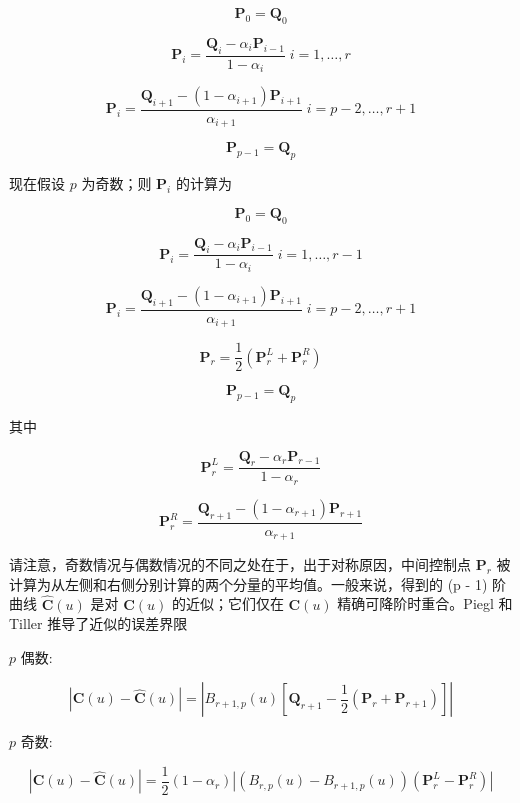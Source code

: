 \documentclass[../main.tex]{subfiles}
\begin{document}
\[
{\mathbf{P}}_{0} = {\mathbf{Q}}_{0}
\]

\[
{\mathbf{P}}_{i} = \frac{{\mathbf{Q}}_{i} - {\alpha }_{i}{\mathbf{P}}_{i - 1}}{1 - {\alpha }_{i}}\;i = 1,\ldots ,r
\]

\[
{\mathbf{P}}_{i} = \frac{{\mathbf{Q}}_{i + 1} - \left( {1 - {\alpha }_{i + 1}}\right) {\mathbf{P}}_{i + 1}}{{\alpha }_{i + 1}}\;i = p - 2,\ldots ,r + 1
\]

\[
{\mathbf{P}}_{p - 1} = {\mathbf{Q}}_{p} \tag{5.41}
\]

现在假设 \(p\) 为奇数；则 \({\mathbf{P}}_{i}\) 的计算为

\[
{\mathbf{P}}_{0} = {\mathbf{Q}}_{0}
\]

\[
{\mathbf{P}}_{i} = \frac{{\mathbf{Q}}_{i} - {\alpha }_{i}{\mathbf{P}}_{i - 1}}{1 - {\alpha }_{i}}\;i = 1,\ldots ,r - 1
\]

\[
{\mathbf{P}}_{i} = \frac{{\mathbf{Q}}_{i + 1} - \left( {1 - {\alpha }_{i + 1}}\right) {\mathbf{P}}_{i + 1}}{{\alpha }_{i + 1}}\;i = p - 2,\ldots ,r + 1
\]

\[
{\mathbf{P}}_{r} = \frac{1}{2}\left( {{\mathbf{P}}_{r}^{L} + {\mathbf{P}}_{r}^{R}}\right)
\]

\[
{\mathbf{P}}_{p - 1} = {\mathbf{Q}}_{p} \tag{5.42}
\]

其中

\[
{\mathbf{P}}_{r}^{L} = \frac{{\mathbf{Q}}_{r} - {\alpha }_{r}{\mathbf{P}}_{r - 1}}{1 - {\alpha }_{r}}
\]

\[
{\mathbf{P}}_{r}^{R} = \frac{{\mathbf{Q}}_{r + 1} - \left( {1 - {\alpha }_{r + 1}}\right) {\mathbf{P}}_{r + 1}}{{\alpha }_{r + 1}}
\]

请注意，奇数情况与偶数情况的不同之处在于，出于对称原因，中间控制点 \({\mathbf{P}}_{r}\) 被计算为从左侧和右侧分别计算的两个分量的平均值。一般来说，得到的 (p - 1) 阶曲线 \(\widehat{\mathbf{C}}\left( u\right)\) 是对 \(\mathbf{C}\left( u\right)\) 的近似；它们仅在 \(\mathbf{C}\left( u\right)\) 精确可降阶时重合。Piegl 和 Tiller \cite{Pieg95} 推导了近似的误差界限

\(p\) 偶数:

\[
\left| {\mathbf{C}\left( u\right)  - \widehat{\mathbf{C}}\left( u\right) }\right|  = \left| {{B}_{r + 1,p}\left( u\right) \left\lbrack  {{\mathbf{Q}}_{r + 1} - \frac{1}{2}\left( {{\mathbf{P}}_{r} + {\mathbf{P}}_{r + 1}}\right) }\right\rbrack  }\right|  \tag{5.43}
\]

\(p\) 奇数:

\[
\left| {\mathbf{C}\left( u\right)  - \widehat{\mathbf{C}}\left( u\right) }\right|  = \frac{1}{2}\left( {1 - {\alpha }_{r}}\right) \left| {\left( {{B}_{r,p}\left( u\right)  - {B}_{r + 1,p}\left( u\right) }\right) \left( {{\mathbf{P}}_{r}^{L} - {\mathbf{P}}_{r}^{R}}\right) }\right|  \tag{5.44}
\]
\end{document}
